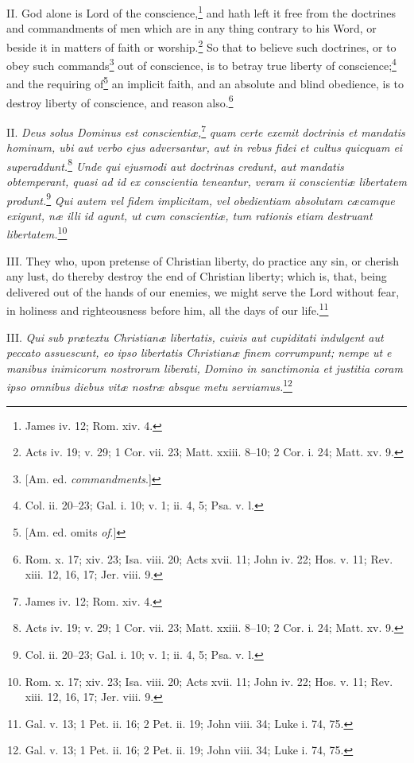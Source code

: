 II. God alone is Lord of the conscience,\footnote{James iv. 12; Rom. xiv. 4.} and hath left it free from the doctrines and commandments of men which are in any thing contrary to his Word, or beside it in matters of faith or worship.\footnote{Acts iv. 19; v. 29; 1 Cor. vii. 23; Matt. xxiii. 8–10; 2 Cor. i. 24; Matt. xv. 9.} So that to believe such doctrines, or to obey such commands\footnote{[Am. ed. \emph{commandments}.]} out of conscience, is to betray true liberty of conscience;\footnote{Col. ii. 20–23; Gal. i. 10; v. 1; ii. 4, 5; Psa. v. l.} and the requiring of\footnote{[Am. ed. omits \emph{of}.]} an implicit faith, and an absolute and blind obedience, is to destroy liberty of conscience, and reason also.\footnote{Rom. x. 17; xiv. 23; Isa. viii. 20; Acts xvii. 11; John iv. 22; Hos. v. 11; Rev. xiii. 12, 16, 17; Jer. viii. 9.}

II. \emph{Deus solus Dominus est conscientiæ,}\footnote{James iv. 12; Rom. xiv. 4.}\emph{ quam certe exemit doctrinis et mandatis hominum, ubi aut verbo ejus adversantur, aut in rebus fidei et cultus quicquam ei superaddunt.}\footnote{Acts iv. 19; v. 29; 1 Cor. vii. 23; Matt. xxiii. 8–10; 2 Cor. i. 24; Matt. xv. 9.}\emph{ Unde qui ejusmodi aut doctrinas credunt, aut mandatis obtemperant, quasi ad id ex conscientia teneantur, veram ii conscientiæ libertatem produnt.}\footnote{Col. ii. 20–23; Gal. i. 10; v. 1; ii. 4, 5; Psa. v. l.}\emph{ Qui autem vel fidem implicitam, vel obedientiam absolutam cæcamque exigunt, næ illi id agunt, ut cum conscientiæ, tum rationis etiam destruant libertatem.}\footnote{Rom. x. 17; xiv. 23; Isa. viii. 20; Acts xvii. 11; John iv. 22; Hos. v. 11; Rev. xiii. 12, 16, 17; Jer. viii. 9.}

III. They who, upon pretense of Christian liberty, do practice any sin, or cherish any lust, do thereby destroy the end of Christian liberty; which is, that, being delivered out of the hands of our enemies, we might serve the Lord without fear, in holiness and righteousness before him, all the days of our life.\footnote{Gal. v. 13; 1 Pet. ii. 16; 2 Pet. ii. 19; John viii. 34; Luke i. 74, 75.}

III. \emph{Qui sub prætextu Christianæ libertatis, cuivis aut cupiditati indulgent aut peccato assuescunt, eo ipso libertatis Christianæ finem corrumpunt; nempe ut e manibus inimicorum nostrorum liberati, Domino in sanctimonia et justitia coram ipso omnibus diebus vitæ nostræ absque metu serviamus.}\footnote{Gal. v. 13; 1 Pet. ii. 16; 2 Pet. ii. 19; John viii. 34; Luke i. 74, 75.}

